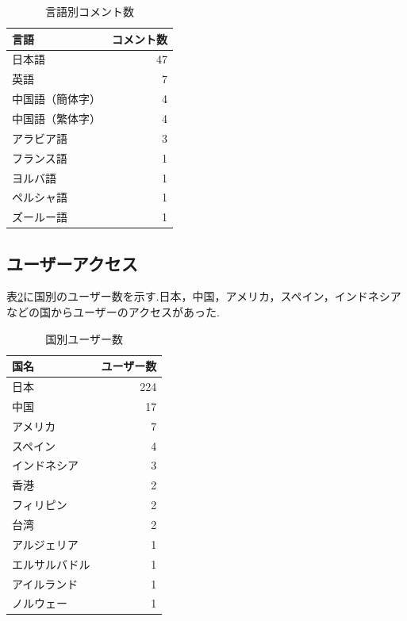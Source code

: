 \documentclass[b5paper,12pt,dvipdfmx]{jsreport}
\begin{document}
\begin{table}[H]
    \centering
    \caption{言語別コメント数}
    \label{tab:language-detection}
    \begin{tabular}{|l|r|}
        \hline
        \textbf{言語} & \textbf{コメント数} \\ \hline
        日本語       & 47           \\
        英語         & 7             \\
        中国語（簡体字） & 4             \\
        中国語（繁体字） & 4             \\ 
        アラビア語     & 3             \\
        フランス語     & 1             \\
        ヨルバ語       & 1             \\
        ペルシャ語     & 1             \\
        ズールー語     & 1             \\\hline
    \end{tabular}
\end{table}

\subsection{ユーザーアクセス}
表\ref{table:user-by-country}に国別のユーザー数を示す.日本，中国，アメリカ，スペイン，インドネシアなどの国からユーザーのアクセスがあった.

\begin{table}[H]
    \centering
    \caption{国別ユーザー数}
    \label{table:user-by-country}
    \begin{tabular}{|l|r|}
        \hline
        \textbf{国名} & \textbf{ユーザー数} \\
        \hline
        日本     & 224 \\
        中国     & 17 \\
        アメリカ & 7 \\
        スペイン & 4 \\
        インドネシア & 3 \\
        香港 & 2  \\
        フィリピン   & 2  \\
        台湾 & 2 \\
        アルジェリア   & 1 \\
        エルサルバドル   & 1 \\
        アイルランド   & 1  \\
        ノルウェー & 1  \\
        \hline
    \end{tabular}
\end{table}
\end{document}
